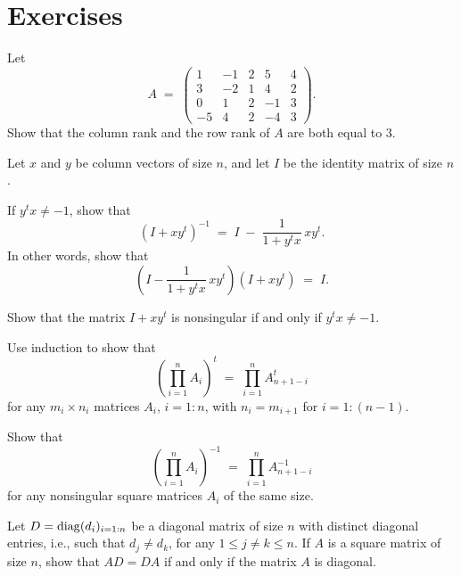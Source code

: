 
\section{Exercises}

\begin{exercises}

\item Let
\[
A \;=\; \begin{pmatrix} 1 & -1 & 2 & 5 & 4 \\ 3 & -2 & 1 & 4 & 2 \\ 0 & 1 & 2 & -1 & 3 \\ -5 & 4 & 2 & -4 & 3 \end{pmatrix}.
\]
Show that the column rank and the row rank of $A$ are both equal to $3$.

\item Let $x$ and $y$ be column vectors of size $n$, and let $I$ be the
identity matrix of size $n$.
\begin{subparts}
\item If $y^{t}x \ne -1$, show that
\[
(I+xy^{t})^{-1} \;=\; I \;-\; \frac{1}{1+y^{t}x}\,xy^{t}.
\]
In other words, show that
\[
\left(I - \frac{1}{1+y^{t}x}\,xy^{t}\right)(I+xy^{t}) \;=\; I.
\]
\item Show that the matrix $I+xy^{t}$ is nonsingular if and only if
$y^{t}x\ne -1$.
\end{subparts}

\item
\begin{subparts}
\item Use induction to show that
\[
\left(\prod_{i=1}^n A_i\right)^{t} \;=\; \prod_{i=1}^n A_{n+1-i}^{t}
\]
for any $m_i\times n_i$ matrices $A_i$, $i=1:n$, with $n_i=m_{i+1}$ for
$i=1:(n-1)$.
\item Show that
\[
\left(\prod_{i=1}^n A_i\right)^{-1} \;=\; \prod_{i=1}^n A_{n+1-i}^{-1}
\]
for any nonsingular square matrices $A_i$ of the same size.
\end{subparts}

\item Let $D=\operatorname{diag}(d_i)_{i=1:n}$ be a diagonal matrix of size $n$ with
distinct diagonal entries, i.e., such that $d_j\ne d_k$, for any
$1\le j\ne k\le n$. If $A$ is a square matrix of size $n$, show that
$AD=DA$ if and only if the matrix $A$ is diagonal.


\end{exercises}
